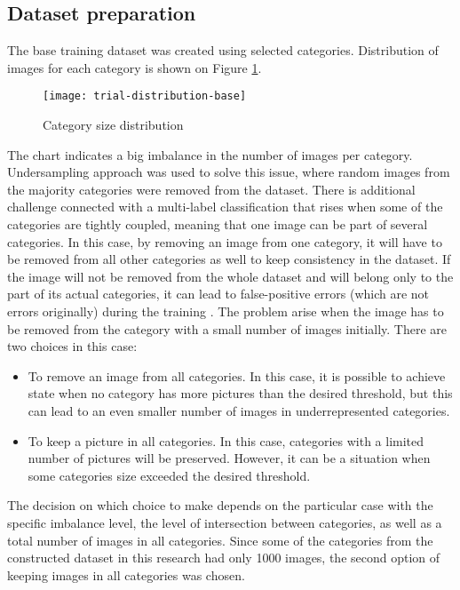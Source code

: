     \subsection{Dataset preparation}
    \label{sec:trial-dataset-prep}
    The base training dataset was created using selected categories. Distribution of images for each category is shown on Figure \ref{fig:trial-distribution-base}.
    
    \begin{figure}[H]
        \centering
        \texttt{[image: trial-distribution-base]}
        \caption[Trial experiment. Category size distribution]{Category size distribution}
        \label{fig:trial-distribution-base}
    \end{figure}
    
    The chart indicates a big imbalance in the number of images per category. Undersampling approach was used to solve this issue, where random images from the majority categories were removed from the dataset. There is additional challenge connected with a multi-label classification that rises when some of the categories are tightly coupled, meaning that one image can be part of several categories. In this case, by removing an image from one category, it will have to be removed from all other categories as well to keep consistency in the dataset. If the image will not be removed from the whole dataset and will belong only to the part of its actual categories, it can lead to false-positive errors (which are not errors originally) during the training \cite{Sechidis2011OnData}. The problem arise when the image has to be removed from the category with a small number of images initially. There are two choices in this case:
    
    \begin{itemize}
        \item To remove an image from all categories. In this case, it is possible to achieve state when no category has more pictures than the desired threshold, but this can lead to an even smaller number of images in underrepresented categories.
        \item To keep a picture in all categories. In this case, categories with a limited number of pictures will be preserved. However, it can be a situation when some categories size exceeded the desired threshold.
    \end{itemize}
    
    The decision on which choice to make depends on the particular case with the specific imbalance level, the level of intersection between categories, as well as a total number of images in all categories. Since some of the categories from the constructed dataset in this research had only 1000 images, the second option of keeping images in all categories was chosen.
    
